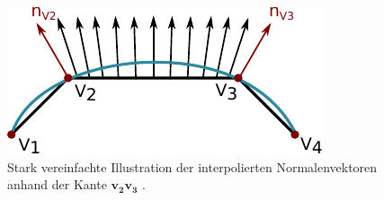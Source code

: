\begin{figure}[H]
    \centering
    \includegraphics{img/phong_shading_mesh_normals.pdf}
    \caption{Stark vereinfachte Illustration der interpolierten
        Normalenvektoren anhand der Kante $\bm{v_{2}v_{3}}$
    \protect\footnotemark.}\label{fig:phong_shading_normals_illustration}
\end{figure}


